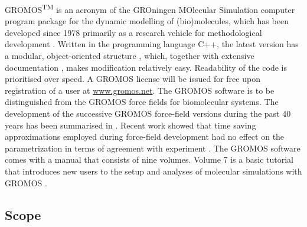 %
%
GROMOS\textsuperscript{TM} is an acronym of the GROningen MOlecular Simulation computer program package for the dynamic modelling of (bio)molecules, which has been developed since 1978 primarily as a research vehicle for methodological development \cite{wfvgn_35_years}. Written in the programming language C++, the latest version has a modular, object-oriented structure \cite{Schmid_2012}, which, together with extensive documentation \cite{volumes_1_to_9}, makes modification relatively easy. Readability of the code is prioritised over speed. A GROMOS license will be issued for free upon registration of a user at \url{www.gromos.net}. The GROMOS software is to be distinguished from the GROMOS force fields for biomolecular systems. The development of the successive GROMOS force-field versions during the past 40 years has been summarised in \cite{wfvgn_35_years,Riniker_FCFF}. 
Recent work showed that time saving approximations employed during force-field development had no effect on the parametrization in terms of agreement with experiment \cite{Diem_2020}.
The GROMOS software comes with a manual that consists of nine volumes. Volume 7 is a basic tutorial that introduces new users to the setup and analyses of molecular simulations with GROMOS \cite{volume_7}.

%
\subsection{Scope}


